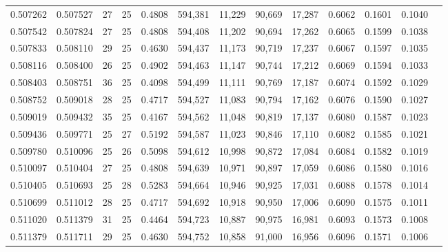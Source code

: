 \begin{tabular}{rrrrrrrrrrrrr}
0.507262 & 0.507527 &    27 &  25 &                                     0.4808 & 594,381 &  11,229 &  90,669 &  17,287 & 0.6062 & 0.1601 & 0.1040 \\
0.507542 & 0.507824 &    27 &  25 &                                     0.4808 & 594,408 &  11,202 &  90,694 &  17,262 & 0.6065 & 0.1599 & 0.1038 \\
0.507833 & 0.508110 &    29 &  25 &                                     0.4630 & 594,437 &  11,173 &  90,719 &  17,237 & 0.6067 & 0.1597 & 0.1035 \\
0.508116 & 0.508400 &    26 &  25 &                                     0.4902 & 594,463 &  11,147 &  90,744 &  17,212 & 0.6069 & 0.1594 & 0.1033 \\
0.508403 & 0.508751 &    36 &  25 &                                     0.4098 & 594,499 &  11,111 &  90,769 &  17,187 & 0.6074 & 0.1592 & 0.1029 \\
0.508752 & 0.509018 &    28 &  25 &                                     0.4717 & 594,527 &  11,083 &  90,794 &  17,162 & 0.6076 & 0.1590 & 0.1027 \\
0.509019 & 0.509432 &    35 &  25 &                                     0.4167 & 594,562 &  11,048 &  90,819 &  17,137 & 0.6080 & 0.1587 & 0.1023 \\
0.509436 & 0.509771 &    25 &  27 &                                     0.5192 & 594,587 &  11,023 &  90,846 &  17,110 & 0.6082 & 0.1585 & 0.1021 \\
0.509780 & 0.510096 &    25 &  26 &                                     0.5098 & 594,612 &  10,998 &  90,872 &  17,084 & 0.6084 & 0.1582 & 0.1019 \\
0.510097 & 0.510404 &    27 &  25 &                                     0.4808 & 594,639 &  10,971 &  90,897 &  17,059 & 0.6086 & 0.1580 & 0.1016 \\
0.510405 & 0.510693 &    25 &  28 &                                     0.5283 & 594,664 &  10,946 &  90,925 &  17,031 & 0.6088 & 0.1578 & 0.1014 \\
0.510699 & 0.511012 &    28 &  25 &                                     0.4717 & 594,692 &  10,918 &  90,950 &  17,006 & 0.6090 & 0.1575 & 0.1011 \\
0.511020 & 0.511379 &    31 &  25 &                                     0.4464 & 594,723 &  10,887 &  90,975 &  16,981 & 0.6093 & 0.1573 & 0.1008 \\
0.511379 & 0.511711 &    29 &  25 &                                     0.4630 & 594,752 &  10,858 &  91,000 &  16,956 & 0.6096 & 0.1571 & 0.1006 \\

\end{tabular}
